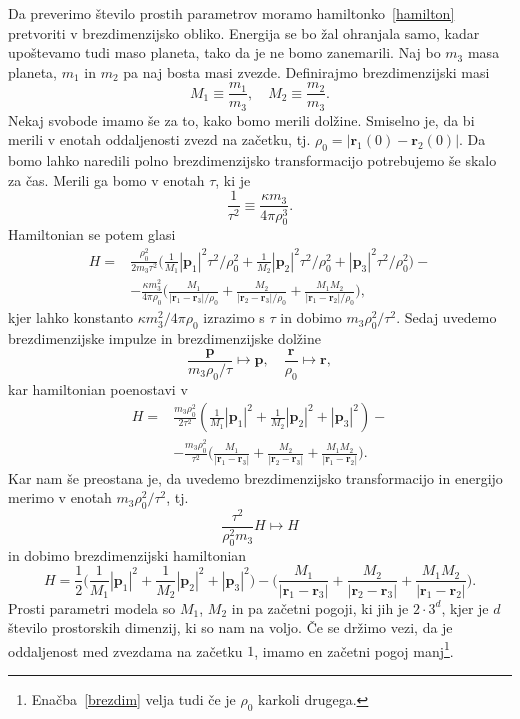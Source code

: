 \documentclass[12pt, a4paper]{article}
\renewcommand{\r}{
    \ensuremath{\mathbf{r}}
}
\newcommand{\p}{
    \ensuremath{\mathbf{p}}
}
\newcommand{\sfrac}[2]{
    \ensuremath{\textstyle{\frac{#1}{#2}}}
}
\newcommand{\Frac}[2]{
    \ensuremath{\displaystyle{\frac{#1}{#2}}}
}
\begin{document}
Da preverimo \v stevilo prostih parametrov moramo hamiltonko~\eqref{hamilton} pretvoriti v brezdimenzijsko
obliko. Energija se bo \v zal ohranjala samo, kadar upo\v stevamo tudi maso planeta, tako da je ne bomo
zanemarili. Naj bo $m_3$ masa planeta, $m_1$ in $m_2$ pa naj bosta masi zvezde. Definirajmo brezdimenzijski
masi
\begin{equation}
    M_1 \equiv \frac{m_1}{m_3}, \quad M_2 \equiv \frac{m_2}{m_3}.
\end{equation}
Nekaj svobode imamo \v se za to, kako bomo merili dol\v zine. Smiselno je, da bi merili v enotah oddaljenosti
zvezd na za\v cetku, tj. $\rho_0 = |\r_1 (0) - \r_2 (0)|$. Da bomo lahko naredili polno brezdimenzijsko
transformacijo potrebujemo \v se skalo za \v cas. Merili ga bomo v enotah $\tau$, ki je
\[
    \frac{1}{\tau^2} \equiv \frac{\kappa m_3}{4\pi\rho_0^3}.
\]
Hamiltonian se potem glasi
\begin{align*}
    H =& \frac{\rho_0^2}{2 m_3\tau^2} \big(\sfrac{1}{M_1}|\p_1|^2\tau^2/\rho_0^2 + \sfrac{1}{M_2}|\p_2|^2\tau^2/\rho_0^2 +
        |\p_3|^2\tau^2/\rho_0^2\big) -\\
       &- \Frac{\kappa m_3^2}{4\pi\rho_0}\bigg(\Frac{M_1}{|\r_1 - \r_3|/\rho_0} + \Frac{M_2}{|\r_2 - \r_3|/\rho_0} +
        \Frac{M_1 M_2}{|\r_1 - \r_2|/\rho_0}\bigg),
\end{align*}
kjer lahko konstanto $\kappa m_3^2/4\pi\rho_0$ izrazimo s $\tau$ in dobimo $m_3\rho_0^2/\tau^2$.
Sedaj uvedemo brezdimenzijske impulze in brezdimenzijske dol\v zine
\begin{equation}
    \frac{\p}{m_3\rho_0/\tau} \mapsto \p, \quad \frac{\r}{\rho_0} \mapsto \r,
\end{equation}
kar hamiltonian poenostavi v
\begin{align*}
    H =& \frac{m_3\rho_0^2}{2\tau^2} (\sfrac{1}{M_1}|\p_1|^2 + \sfrac{1}{M_2}|\p_2|^2 + |\p_3|^2) -\\
       &- \Frac{m_3\rho_0^2}{\tau^2}\bigg(\Frac{M_1}{|\r_1 - \r_3|} + \Frac{M_2}{|\r_2 - \r_3|} +
        \Frac{M_1 M_2}{|\r_1 - \r_2|}\bigg).
\end{align*}
Kar nam \v se preostana je, da uvedemo brezdimenzijsko transformacijo in energijo merimo v enotah
$m_3\rho_0^2/\tau^2$, tj.
\[
    \frac{\tau^2}{\rho_0^2 m_3}H \mapsto H
\]
in dobimo brezdimenzijski hamiltonian
\begin{equation}
    H = \frac{1}{2}\Big(\sfrac{1}{M_1}|\p_1|^2 + \sfrac{1}{M_2}|\p_2|^2 + |\p_3|^2\Big)
        - \bigg(\Frac{M_1}{|\r_1 - \r_3|} + \Frac{M_2}{|\r_2 - \r_3|} + \Frac{M_1 M_2}{|\r_1 - \r_2|}\bigg).
    \label{brezdim}
\end{equation}
Prosti parametri modela so $M_1$, $M_2$ in pa za\v cetni pogoji, ki jih je $2 \cdot 3^d$, kjer je $d$
\v stevilo prostorskih dimenzij, ki so nam na voljo. \v Ce se dr\v zimo vezi, da je oddaljenost med zvezdama
na za\v cetku $1$, imamo en za\v cetni pogoj manj\footnote{Ena\v cba~\eqref{brezdim} velja tudi \v ce je
$\rho_0$ karkoli drugega.}.
\end{document}
